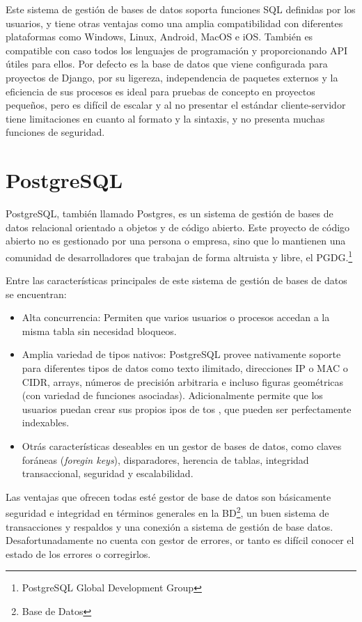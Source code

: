\documentclass[a4paper, 12pt]{book}
\begin{document}
Este sistema de gestión de bases de datos soporta funciones SQL definidas por los usuarios, y tiene otras ventajas como una amplia compatibilidad con diferentes plataformas como Windows, Linux, Android, MacOS e iOS. También es compatible con caso todos los lenguajes de programación y proporcionando API útiles para ellos. Por defecto es la base de datos que viene configurada para proyectos de Django, por su ligereza, independencia de paquetes externos y la eficiencia de sus procesos es ideal para pruebas de concepto en proyectos pequeños, pero es difícil de escalar y al no presentar el estándar cliente-servidor tiene limitaciones en cuanto al formato y la sintaxis, y no presenta muchas funciones de seguridad.

\section{PostgreSQL}
PostgreSQL, también llamado Postgres, es un sistema de gestión de bases de datos relacional orientado a objetos y de código abierto. Este proyecto de código abierto no es gestionado por una persona o empresa, sino que lo mantienen una comunidad de desarrolladores que trabajan de forma altruista y libre, el PGDG.\footnote{PostgreSQL Global Development Group}

Entre las características principales de este sistema de gestión de bases de datos se encuentran: 
\begin{itemize}
	\item Alta concurrencia: Permiten que varios usuarios o procesos accedan a la misma tabla sin necesidad bloqueos. 
	\item Amplia variedad de tipos nativos: PostgreSQL provee nativamente soporte para diferentes tipos de datos como texto ilimitado, direcciones IP o MAC o CIDR, arrays, números de precisión arbitraria e incluso figuras geométricas (con variedad de funciones asociadas). Adicionalmente permite que los usuarios puedan crear sus propios ipos de tos , que pueden ser  perfectamente indexables. 
	\item Otrás características deseables en un gestor de bases de datos, como claves foráneas (\emph{foregin keys}), disparadores, herencia de tablas, integridad transaccional, seguridad y escalabilidad.  
\end{itemize}
Las ventajas que ofrecen todas esté gestor de base de datos son básicamente seguridad e integridad en términos generales en la BD\footnote{Base de Datos}, un buen sistema de transacciones y respaldos y una conexión a sistema de gestión de base datos. Desafortunadamente no cuenta con gestor de errores, or tanto es difícil conocer el estado de los errores o corregirlos. 
\end{document}
